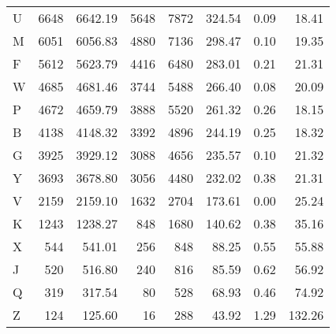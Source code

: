 \begin{tabular}{lrrrrrrr}
     U &          6648 &           6642.19 &              5648 &              7872 &              324.54 &                    0.09 &                   18.41 \\
     M &          6051 &           6056.83 &              4880 &              7136 &              298.47 &                    0.10 &                   19.35 \\
     F &          5612 &           5623.79 &              4416 &              6480 &              283.01 &                    0.21 &                   21.31 \\
     W &          4685 &           4681.46 &              3744 &              5488 &              266.40 &                    0.08 &                   20.09 \\
     P &          4672 &           4659.79 &              3888 &              5520 &              261.32 &                    0.26 &                   18.15 \\
     B &          4138 &           4148.32 &              3392 &              4896 &              244.19 &                    0.25 &                   18.32 \\
     G &          3925 &           3929.12 &              3088 &              4656 &              235.57 &                    0.10 &                   21.32 \\
     Y &          3693 &           3678.80 &              3056 &              4480 &              232.02 &                    0.38 &                   21.31 \\
     V &          2159 &           2159.10 &              1632 &              2704 &              173.61 &                    0.00 &                   25.24 \\
     K &          1243 &           1238.27 &               848 &              1680 &              140.62 &                    0.38 &                   35.16 \\
     X &           544 &            541.01 &               256 &               848 &               88.25 &                    0.55 &                   55.88 \\
     J &           520 &            516.80 &               240 &               816 &               85.59 &                    0.62 &                   56.92 \\
     Q &           319 &            317.54 &                80 &               528 &               68.93 &                    0.46 &                   74.92 \\
     Z &           124 &            125.60 &                16 &               288 &               43.92 &                    1.29 &                  132.26 \\
\bottomrule
\end{tabular}
